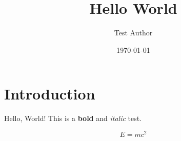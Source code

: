 \documentclass{article}
\title{Hello World}
\author{Test Author}
\date{\today}
\begin{document}
\maketitle

\section{Introduction}
Hello, World! This is a \textbf{bold} and \textit{italic} test.

\begin{equation}
    E = mc^2
\end{equation}
\end{document}
